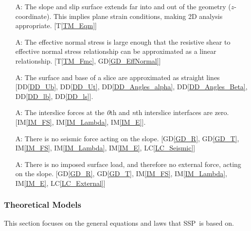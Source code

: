 \documentclass[12pt]{article}
\newcommand{\progname}{SSP}
\newcounter{assumpnum} %
\newcommand{\tref}[1]{T\ref{#1}}
\newcommand{\iref}[1]{IM\ref{#1}}
\newcommand{\ddref}[1]{DD\ref{#1}}
\newcommand{\dref}[1]{GD\ref{#1}}
\newcommand{\lcref}[1]{LC\ref{#1}}
\begin{document}
\begin{enumerate}[label=A\arabic*:,ref={\arabic*}]
\item [A\refstepcounter{assumpnum}\theassumpnum: \label{A_2D}] The
  slope and slip surface extends far into and out of the geometry 
  ($z$-coordinate). This implies plane strain conditions, making 2D
  analysis appropriate. [\tref{TM_Eqm}]

\item [A\refstepcounter{assumpnum}\theassumpnum: \label{A_Lin}] The
  effective normal stress is large enough that the resistive shear to
  effective normal stress relationship can be approximated as a linear
  relationship. [\tref{TM_Fmc}, \dref{GD_EffNormal}]

\item [A\refstepcounter{assumpnum}\theassumpnum: \label{A_Straight}]
  The surface and base of a slice are approximated as straight lines 
  [\ddref{DD_Ub}, \ddref{DD_Ut}, \ddref{DD_Angles_alpha}, 
  \ddref{DD_Angles_Beta}, \ddref{DD_lb}, \ddref{DD_ls}].
  
\item [A\refstepcounter{assumpnum}\theassumpnum: \label{A_EdgeSlices}] The 
interslice forces at the \textit{0}th and \textit{n}th interslice interfaces 
are zero. [\iref{IM_FS}, \iref{IM_Lambda}, \iref{IM_E}].
  
\item [A\refstepcounter{assumpnum}\theassumpnum: \label{A_Seismic}] There is no 
seismic force acting on the slope. [\dref{GD_R}, \dref{GD_T}, \iref{IM_FS}, 
\iref{IM_Lambda}, \iref{IM_E}, \lcref{LC_Seismic}]
  
\item [A\refstepcounter{assumpnum}\theassumpnum: \label{A_External}] There is 
no imposed surface load, and therefore no external force, acting on the slope. 
[\dref{GD_R}, \dref{GD_T}, \iref{IM_FS}, \iref{IM_Lambda}, \iref{IM_E}, 
\lcref{LC_External}]

\end{enumerate}

\subsubsection{Theoretical Models} \label{sec_theoretical}

This section focuses on the general equations and laws that \progname\ is based
on.

~\newline
\end{document}
